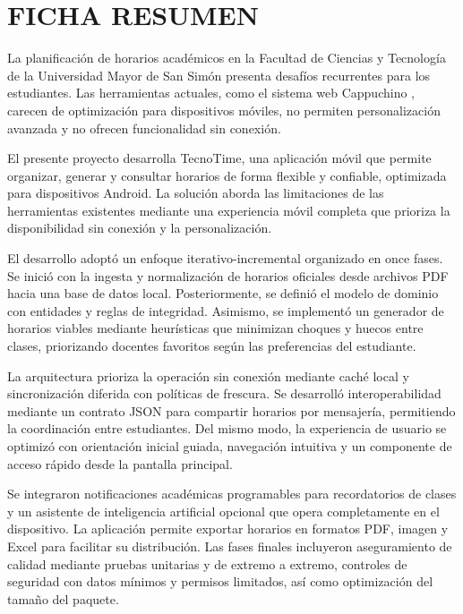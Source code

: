 \chapter*{FICHA RESUMEN}

\noindent La planificación de horarios académicos en la Facultad de Ciencias y Tecnología de la Universidad Mayor de San Simón presenta desafíos recurrentes para los estudiantes. Las herramientas actuales, como el sistema web Cappuchino \cite{cappuccino_umss}, carecen de optimización para dispositivos móviles, no permiten personalización avanzada y no ofrecen funcionalidad sin conexión.

\noindent El presente proyecto desarrolla TecnoTime, una aplicación móvil que permite organizar, generar y consultar horarios de forma flexible y confiable, optimizada para dispositivos Android. La solución aborda las limitaciones de las herramientas existentes mediante una experiencia móvil completa que prioriza la disponibilidad sin conexión y la personalización.

\noindent El desarrollo adoptó un enfoque iterativo-incremental organizado en once fases. Se inició con la ingesta y normalización de horarios oficiales desde archivos PDF hacia una base de datos local. Posteriormente, se definió el modelo de dominio con entidades y reglas de integridad. Asimismo, se implementó un generador de horarios viables mediante heurísticas que minimizan choques y huecos entre clases, priorizando docentes favoritos según las preferencias del estudiante.

\noindent La arquitectura prioriza la operación sin conexión mediante caché local y sincronización diferida con políticas de frescura. Se desarrolló interoperabilidad mediante un contrato JSON para compartir horarios por mensajería, permitiendo la coordinación entre estudiantes. Del mismo modo, la experiencia de usuario se optimizó con orientación inicial guiada, navegación intuitiva y un componente de acceso rápido desde la pantalla principal.

\noindent Se integraron notificaciones académicas programables para recordatorios de clases y un asistente de inteligencia artificial opcional que opera completamente en el dispositivo. La aplicación permite exportar horarios en formatos PDF, imagen y Excel para facilitar su distribución. Las fases finales incluyeron aseguramiento de calidad mediante pruebas unitarias y de extremo a extremo, controles de seguridad con datos mínimos y permisos limitados, así como optimización del tamaño del paquete.

